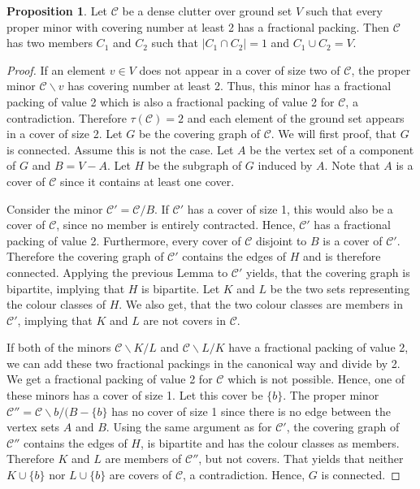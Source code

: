 \documentclass[a4paper, 12pt, twoside=false]{scrbook}
\theoremstyle{definition}
\newtheorem{proposition}{Proposition}
\begin{document}
   \begin{proposition}
       Let $\mathcal{C}$ be a dense clutter over ground set $V$ such that every proper minor with covering number at least 2 has a fractional packing.
       Then $\mathcal{C}$ has two members $C_1$ and $C_2$ such that $|C_1 \cap C_2|=1$ and $C_1 \cup C_2 = V$.
   \end{proposition}

   \begin{proof}
       If an element $v \in V$ does not appear in a cover of size two of $\mathcal{C}$, the proper minor $\mathcal{C} \backslash v$ has covering number at least 2.
       Thus, this minor has a fractional packing of value 2 which is also a fractional packing of value 2 for $\mathcal{C}$, a contradiction.
       Therefore $\tau(\mathcal{C}) = 2$ and each element of the ground set appears in a cover of size 2.
       Let $G$ be the covering graph of $\mathcal{C}$.
       We will first proof, that $G$ is connected.
       Assume this is not the case.
       Let $A$ be the vertex set of a component of $G$ and $B = V - A$.
       Let $H$ be the subgraph of $G$ induced by $A$.
       Note that $A$ is a cover of $\mathcal{C}$ since it contains at least one cover.

       Consider the minor $\mathcal{C'}=\mathcal{C}/B$.
       If $\mathcal{C'}$ has a cover of size 1, this would also be a cover of $\mathcal{C}$, since no member is entirely contracted.
       Hence, $\mathcal{C'}$ has a fractional packing of value 2.
       Furthermore, every cover of $\mathcal{C}$ disjoint to $B$ is a cover of $\mathcal{C'}$.
       Therefore the covering graph of $\mathcal{C'}$ contains the edges of $H$ and is therefore connected.
       Applying the previous Lemma to $\mathcal{C'}$ yields, that the covering graph is bipartite, implying that $H$ is bipartite.
       Let $K$ and $L$ be the two sets representing the colour classes of $H$.
       We also get, that the two colour classes are members in $\mathcal{C'}$, implying that $K$ and $L$ are not covers in $\mathcal{C}$.

       If both of the minors $\mathcal{C} \backslash K / L$ and $\mathcal{C} \backslash L / K$ have a fractional packing of value 2, we can add these two fractional packings in the canonical way and divide by 2.
       We get a fractional packing of value 2 for $\mathcal{C}$ which is not possible.
       Hence, one of these minors has a cover of size 1.
       Let this cover be $\{b\}$.
       The proper minor $\mathcal{C''}=\mathcal{C} \backslash b / (B-\{b\}$ has no cover of size 1 since there is no edge between the vertex sets $A$ and $B$.
       Using the same argument as for $\mathcal{C'}$, the covering graph of $\mathcal{C''}$ contains the edges of $H$, is bipartite and has the colour classes as members.
       Therefore $K$ and $L$ are members of $\mathcal{C''}$, but not covers.
       That yields that neither $K \cup \{b\}$ nor $L \cup \{b\}$ are covers of $\mathcal{C}$, a contradiction.
       Hence, $G$ is connected.


\end{proof}
\end{document}
